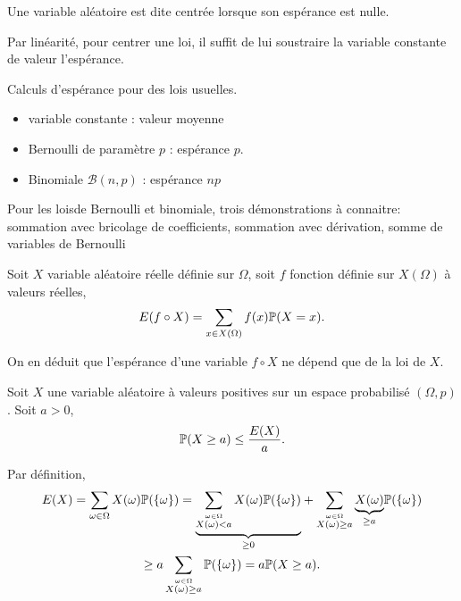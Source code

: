 \begin{defi}
 Une variable aléatoire est dite centrée lorsque son espérance est nulle.
\end{defi}
\begin{rem}
Par linéarité, pour centrer une loi, il suffit de lui soustraire la variable constante de valeur l'espérance.  
\end{rem}
\clearpage
\begin{exple} Calculs d'espérance pour des lois usuelles.
\begin{itemize}
 \item variable constante : valeur moyenne
 \item Bernoulli de paramètre $p$ : espérance $p$.
 \item Binomiale $\mathcal{B}(n,p)$ : espérance $np$
\end{itemize}
Pour les loisde Bernoulli et binomiale, trois démonstrations à connaitre: sommation avec bricolage de coefficients, sommation avec dérivation, somme de variables de Bernoulli
\end{exple}
\clearpage
{}
\begin{prop}
 Soit $X$ variable aléatoire réelle définie sur $\Omega$, soit $f$ fonction définie sur $X(\Omega)$ à valeurs réelles,
\begin{displaymath}
 E(f\circ X) = \sum_{x\in X(\Omega)} f(x)\mathbb{P}(X=x).
\end{displaymath}
\end{prop}
On en déduit que l'espérance d'une variable $f\circ X$ ne dépend que de la loi de $X$.
\begin{prop}
 Soit $X$ une variable aléatoire à valeurs positives sur un espace probabilisé $(\Omega,p)$. Soit $a>0$,
\begin{displaymath}
 \mathbb{P}(X\geq a) \leq \frac{E(X)}{a}.
\end{displaymath}
\end{prop}
\begin{demo}
 Par définition,
\begin{multline*}
 E(X) = \sum_{\omega \in \Omega}X(\omega)\mathbb{P}(\{\omega\})
= \underset{\geq 0}{\underbrace{\sum_{\stackrel{\omega \in \Omega}{X(\omega)<a}}X(\omega)\mathbb{P}(\{\omega\})}}
 + \sum_{\stackrel{\omega \in \Omega}{X(\omega)\geq a}}\underset{\geq a}{\underbrace{X(\omega)}} \mathbb{P}(\{\omega\})\\
\geq a \sum_{\stackrel{\omega \in \Omega}{X(\omega)\geq a}} \mathbb{P}(\{\omega\})
= a \mathbb{P}(X\geq a).
\end{multline*}
\end{demo}
